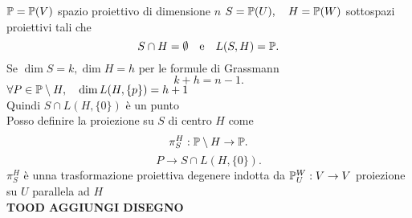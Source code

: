 \documentclass[12px]{article}
\begin{document}
\ \\ \hline \ \\
 $\mathbb{P}=\mathbb{P}(V)$ spazio proiettivo di dimensione $n$ $S = \mathbb{P} (U),\ \ \ H = \mathbb{P}(W)$ sottospazi proiettivi tali che 
 \[
  S\cap H = \emptyset \ \ \text{ e} \ \ \ L(S,H)=\mathbb{P}
 .\] 
 Se $\dim S = k, \dim H = h$ per le formule di Grassmann
  \[
 k + h = n-1
 .\] 
$\forall P\in \mathbb{P}\setminus H, \ \ \ \dim L(H,\{p\})=h+1$\\
Quindi $S\cap L(H,\{0\}) $ è un punto\\
Posso definire la proiezione su  $S$ di centro $H$ come
\[
 \pi^H_S: \mathbb{P}\setminus H \rightarrow \mathbb{P}
.\] 
\[
	P \rightarrow S\cap L(H,\{0\})
.\] 
$\pi^H_S$ è unna trasformazione proiettiva degenere indotta da $\mathbb{P}^W_U :V \rightarrow V$ proiezione su $U$ parallela ad $H$\\
 \textbf{TOOD AGGIUNGI DISEGNO}
\end{document}

